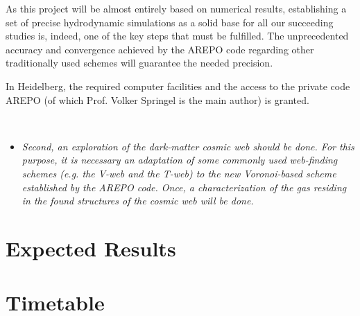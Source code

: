 \documentclass[a4,useAMS,usenatbib,usegraphicx,12pt]{article}
\begin{document}
As this project will be almost entirely based on numerical results, establishing
a set of precise hydrodynamic simulations as a solid base for all our succeeding
studies is, indeed, one of the key steps that must be fulfilled. The unprecedented 
accuracy and convergence achieved by the AREPO code regarding other traditionally 
used schemes will guarantee the needed precision.


In Heidelberg, the required computer facilities and the access to the private 
code AREPO (of which Prof. Volker Springel is the main author) is granted.

\

\begin{itemize}

\item[\checkmark] \textit{Second, an exploration of the dark-matter cosmic web
should be done. For this purpose, it is necessary an adaptation of some commonly 
used web-finding schemes (e.g. the V-web and the T-web) to the new Voronoi-based 
scheme established by the AREPO code. Once, a characterization of the gas residing
in the found structures of the cosmic web will be done.}

\end{itemize}



\section{Expected Results}


\section{\bibname}





\section{Timetable}
\end{document}
